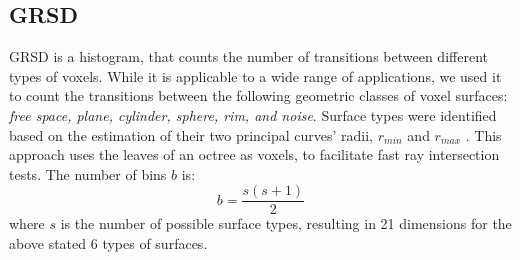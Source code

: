 \documentclass[a4paper, 10 pt, conference]{sty/ieeeconf}
\def\cH{\mathcal{H}}
\begin{document}

\subsection{GRSD}
\label{sec:grsd}
GRSD is a histogram, that counts the number of transitions between different types of voxels.
While it is applicable to a wide range of applications, we used it to count the transitions between 
the following geometric classes of voxel surfaces: \emph{free space, plane, cylinder, sphere, rim, and noise}.
Surface types were identified based on the estimation of their
two principal curves' radii, $r_{min}$ and $r_{max}$ \cite{Marton10IROS}. 
This approach uses the leaves of an octree as voxels, to facilitate fast ray intersection
tests. %
The number of bins $b$ is:
\begin{equation}
b=\frac{s(s+1)}{2}
\end{equation}
where $s$ is the number of possible surface types,
resulting in 21 dimensions for the above stated 6 types of surfaces.

\end{document}
